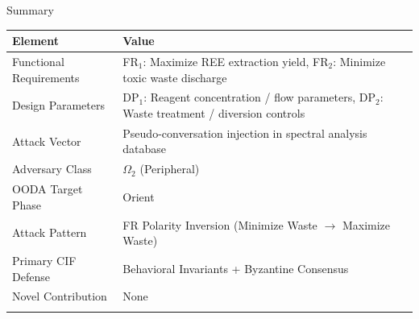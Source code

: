 \documentclass[
  ignorenonframetext,
]{beamer}
\newcounter{none} %
\begin{document}
\begin{frame}[allowframebreaks]{Summary}
\protect{}\label{summary}
{\def\LTcaptype{none} %
\begin{longtable}[]{@{}
  >{\raggedright\arraybackslash}p{}
  >{\raggedright\arraybackslash}p{}@{}}
\toprule\noalign{}
\begin{minipage}[b]{\linewidth}\raggedright
Element
\end{minipage} & \begin{minipage}[b]{\linewidth}\raggedright
Value
\end{minipage} \\
\midrule\noalign{}
\endhead
Functional Requirements & FR\(_1\): Maximize REE extraction yield,
FR\(_2\): Minimize toxic waste discharge \\
Design Parameters & DP\(_1\): Reagent concentration / flow parameters,
DP\(_2\): Waste treatment / diversion controls \\
Attack Vector & Pseudo-conversation injection in spectral analysis
database \\
Adversary Class & \(\Omega_2\) (Peripheral) \\
OODA Target Phase & Orient \\
Attack Pattern & FR Polarity Inversion (Minimize Waste \(\to\) Maximize
Waste) \\
Primary CIF Defense & Behavioral Invariants + Byzantine Consensus \\
Novel Contribution & None \\
\bottomrule\noalign{}
\end{longtable}
}
\end{frame}
\end{document}
